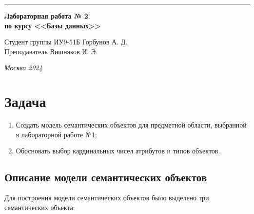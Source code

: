 \documentclass[a4paper, 14pt]{extarticle}
\begin{document}
\begin{titlepage}
\vspace*{-16pt}
\hspace{30pt}\rule{0.866\textwidth}{0.4pt}
  
\vspace{11em}

\begin{center}
\Large {\bf Лабораторная работа № 2} \\ 
\large {\bf по курсу <<Базы данных>>}\\
\end{center}\normalsize

\vspace{8em}


\begin{flushright}
  {Студент группы ИУ9-51Б Горбунов А. Д.\hspace*{15pt} \\
  \vspace{2ex}
  Преподаватель Вишняков И. Э.\hspace*{15pt}}
\end{flushright}

\bigskip

\vfill
 

\begin{center}
\textsl{Москва 2024}
\end{center}
\end{titlepage}

\renewcommand{\ttdefault}{pcr}

\setlength{\tabcolsep}{3pt}
\newpage
\setcounter{page}{2}

\section{Задача}\label{Sect::task}
\par

\begin{enumerate}
    \item Создать модель семантических объектов для предметной области, выбранной в лабораторной работе №1;
    \item Обосновать выбор кардинальных чисел атрибутов и типов объектов.
\end{enumerate}

\par

\subsection{Описание модели семантических объектов}\label{Sect::task}
Для построения модели семантических объектов было выделено три семантических объекта:
\end{document}
